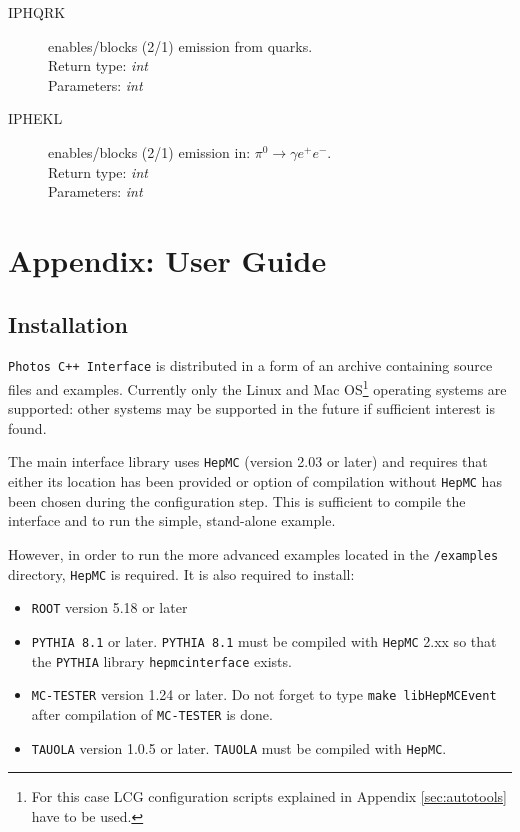 \documentclass[]{Photos_interface_design}
\begin{document}
\begin{description}
\item[IPHQRK] enables/blocks (2/1) emission from quarks. \\
  Return type: \textit{int} \\
  Parameters: \textit{int}
\end{description}

\begin{description}
\item[IPHEKL] enables/blocks (2/1) emission in: $\pi^0 \rightarrow \gamma e^+ e^-$. \\
  Return type: \textit{int} \\
  Parameters: \textit{int}
\end{description}

\section{Appendix: User Guide}
\label{sec:User Guide}

\subsection{Installation}
\label{sec:Installation}
 
{\tt Photos C++ Interface} is distributed in a form of an archive containing source files and examples.
Currently only the Linux and Mac OS\footnote{For this case LCG configuration 
scripts explained in Appendix \ref{sec:autotools} have to be used.} operating systems are supported: other systems may be
supported in the future if sufficient interest is found.

The main interface library uses {\tt HepMC} \cite{Dobbs:2001ck} (version 2.03 or later) and requires that either
its location has been provided or option of compilation without {\tt HepMC} has been chosen during the configuration step. This is sufficient to compile the interface and to run the simple, stand-alone example.

However, in order to run the more advanced examples located in the {\tt /examples} directory, {\tt HepMC} is required. It is also required to install:

\begin{itemize}
  \item {\tt ROOT} \cite{root-install-www} version 5.18 or later
  \item {\tt PYTHIA 8.1} \cite{Sjostrand:2007gs} or later. {\tt PYTHIA 8.1} must be compiled with {\tt HepMC} 2.xx
        so that the {\tt PYTHIA} library {\tt hepmcinterface} exists.
  \item {\tt MC-TESTER} \cite{Golonka:2002rz,Davidson:2008ma} version 1.24 or later.
        Do not forget to type {\tt make libHepMCEvent} after compilation of {\tt MC-TESTER} is done.
  \item {\tt TAUOLA} \cite{Davidson:2010rw} version 1.0.5 or later. {\tt TAUOLA} must be compiled with {\tt HepMC}.
\end{itemize}
\end{document}
